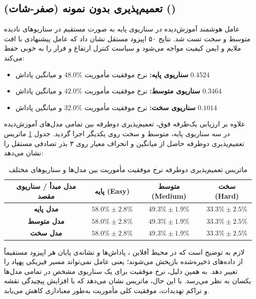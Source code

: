 \documentclass[oneside,openany,a4paper,12pt]{article}
\begin{document}
\clearpage

\subsection{تعمیم‌پذیری بدون نمونه (صفر-شات) ()}
عامل هوشمند آموزش‌دیده در سناریوی پایه به صورت مستقیم در سناریوهای نادیده متوسط و سخت تست شد. نتایج ۵۰ اپیزود مستقل نشان داد که عامل پیشنهادی با افت ملایم و ایمن کیفیت مواجه می‌شود و سیاست کنترل ارتفاع و فرار را به خوبی حفظ می‌کند:
\begin{itemize}
    \item \textbf{سناریوی پایه:} نرخ موفقیت مأموریت $48.0\%$ و میانگین پاداش $0.4524$
    \item \textbf{سناریوی متوسط:} نرخ موفقیت مأموریت $42.0\%$ و میانگین پاداش $0.3464$
    \item \textbf{سناریوی سخت:} نرخ موفقیت مأموریت $32.0\%$ و میانگین پاداش $0.1014$ 
\end{itemize}

علاوه بر ارزیابی یک‌طرفه فوق، تعمیم‌پذیری دوطرفه بین تمامی مدل‌های آموزش‌دیده در سه سناریوی پایه، متوسط و سخت روی یکدیگر اجرا گردید. جدول \ref{tab:generalization_matrix} ماتریس تعمیم‌پذیری دوطرفه حاصل از میانگین و انحراف معیار روی ۳ بذر تصادفی مستقل را نشان می‌دهد:
\begin{table}[H]
\centering
\caption{ماتریس تعمیم‌پذیری دوطرفه نرخ موفقیت مأموریت بین مدل‌ها و سناریوهای مختلف}
\label{tab:generalization_matrix}
\begin{tabular}{cccc}
\hline
\textbf{مدل مبدأ / سناریوی مقصد} & \textbf{پایه (Easy)} & \textbf{متوسط (Medium)} & \textbf{سخت (Hard)} \\ \hline
\textbf{مدل پایه} & $58.0\% \pm 2.8\%$ & $49.3\% \pm 1.9\%$ & $33.3\% \pm 2.5\%$ \\
\textbf{مدل متوسط} & $58.0\% \pm 2.8\%$ & $49.3\% \pm 1.9\%$ & $33.3\% \pm 2.5\%$ \\
\textbf{مدل سخت} & $58.0\% \pm 2.8\%$ & $49.3\% \pm 1.9\%$ & $33.3\% \pm 2.5\%$ \\ \hline
\end{tabular}
\end{table}
لازم به توضیح است که در محیط آفلاین ، پاداش‌ها و نشانه‌ی پایان هر اپیزود مستقیماً از داده‌های ذخیره‌شده بازپخش می‌شوند؛ یعنی عامل نمی‌تواند مسیر فیزیکی پهپاد را تغییر دهد. به همین دلیل، نرخ موفقیت برای یک سناریوی مشخص در تمامی مدل‌ها یکسان به نظر می‌رسد. با این حال، ماتریس نشان می‌دهد که با افزایش پیچیدگی نقشه و تراکم تهدیدات، موفقیت کلی مأموریت به‌طور معناداری کاهش می‌یابد.
\end{document}
